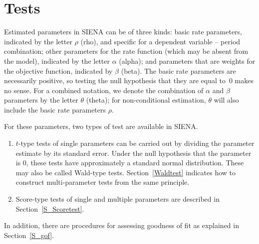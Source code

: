 \documentclass[a4paper,fleqn,11pt]{article}
\newcommand{\+}{\, + \,}
\newcommand{\SI}{{\sf SIENA }}
\newcommand{\si}{{\sf SIENA}}
\begin{document}
\newpage
\section{Tests}
\label{S_test}

Estimated parameters in \SI can be of three kinds:
basic rate parameters, indicated by the letter $\rho$ (rho), and specific for a
dependent variable -- period combination; other parameters for the rate function
(which may be absent from the model), indicated by the letter $\alpha$ (alpha);
and parameters that are weights for the objective function, indicated by $\beta$ (beta).
The basic rate parameters are necessarily positive,
so testing the null hypothesis that they are equal to~0 makes no sense.
For a combined notation, we denote the combination of $\alpha$ and $\beta$ parameters
by the letter $\theta$ (theta); for non-conditional estimation,
$\theta$ will also include the basic rate parameters $\rho$.

For these parameters, two types of test are available in \si.

\begin{enumerate}
\item $t$-type tests of single parameters can be carried out by
dividing the parameter estimate by its standard error.
Under the null hypothesis that the parameter is 0,
these tests have approximately a standard normal distribution.
These may also be called Wald-type tests.
Section~\ref{Waldtest} indicates how to construct multi-parameter tests
from the same principle.

\item Score-type tests of single and multiple parameters
      are described in Section~\ref{S_Scoretest}.

\end{enumerate}
In addition, there are procedures for assessing goodness of fit
as explained in Section~\ref{S_gof}.
\end{document}
